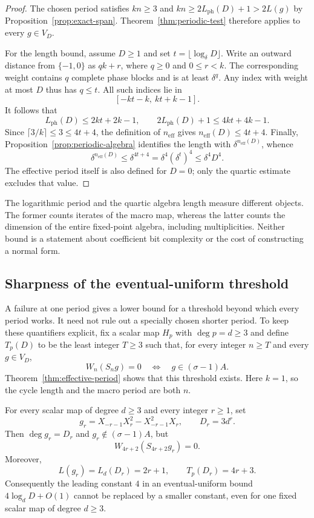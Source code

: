 \begin{proof}
The chosen period satisfies $kn\ge3$ and
$kn\ge2L_{\mathrm{ph}}(D)+1>2L(g)$ by
Proposition~\ref{prop:exact-span}.  Theorem~\ref{thm:periodic-test}
therefore applies to every $g\in V_D$.

For the length bound, assume $D\ge1$ and set
$t=\lfloor\log_\delta D\rfloor$.  Write an outward distance from
$\{-1,0\}$ as $qk+r$, where $q\ge0$ and $0\le r<k$.
The corresponding weight contains $q$ complete phase blocks and
is at least $\delta^q$.  Any index with weight at most $D$ thus
has $q\le t$.  All such indices lie in
\[
 [-kt-k,\ kt+k-1].
\]
It follows that
\[
 L_{\mathrm{ph}}(D)\le2kt+2k-1,
 \qquad
 2L_{\mathrm{ph}}(D)+1\le4kt+4k-1.
\]
Since $\lceil3/k\rceil\le3\le4t+4$, the definition of
$n_{\mathrm{eff}}$ gives $n_{\mathrm{eff}}(D)\le4t+4$.
Finally, Proposition~\ref{prop:periodic-algebra} identifies the
length with $\delta^{n_{\mathrm{eff}}(D)}$, whence
\[
 \delta^{n_{\mathrm{eff}}(D)}
 \le\delta^{4t+4}
 =\delta^4(\delta^t)^4\le\delta^4D^4.
\]
The effective period itself is also defined for $D=0$; only the
quartic estimate excludes that value.
\end{proof}

The logarithmic period and the quartic algebra length measure different
objects.  The former counts iterates of the macro map, whereas the latter
counts the dimension of the entire fixed-point algebra, including
multiplicities.  Neither bound is a statement about coefficient bit
complexity or the cost of constructing a normal form.

\subsection{Sharpness of the eventual-uniform threshold}

A failure at one period gives a lower bound for a threshold beyond
which every period works.  It need not rule out a specially chosen
shorter period.  To keep these quantifiers explicit, fix a scalar map
$H_p$ with $\deg p=d\ge3$ and define $T_p(D)$ to be the least integer
$T\ge3$ such that, for every integer $n\ge T$ and every $g\in V_D$,
\[
 W_n(S_ng)=0\quad\Longleftrightarrow\quad g\in(\sigma-1)A.
\]
Theorem~\ref{thm:effective-period} shows that this threshold exists.
Here $k=1$, so the cycle length and the macro period are both $n$.

\begin{theorem}\label{thm:sharp-threshold}
For every scalar map of degree $d\ge3$ and every integer $r\ge1$, set
\[
 g_r=X_{-r-1}X_r^2-X_{-r-1}^2X_r,
 \qquad D_r=3d^r.
\]
Then $\deg g_r=D_r$ and $g_r\notin(\sigma-1)A$, but
\[
 W_{4r+2}(S_{4r+2}g_r)=0.
\]
Moreover,
\[
 L(g_r)=L_d(D_r)=2r+1,
 \qquad T_p(D_r)=4r+3.
\]
Consequently the leading constant $4$ in an eventual-uniform bound
$4\log_dD+O(1)$ cannot be replaced by a smaller constant, even for
one fixed scalar map of degree $d\ge3$.
\end{theorem}

